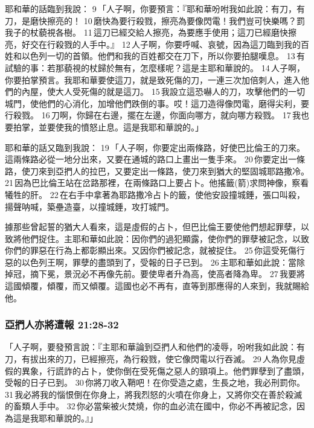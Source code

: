 耶和華的話臨到我說： 9 「人子啊，你要預言：『耶和華吩咐我如此說：有刀，有刀，是磨快擦亮的！ 10 磨快為要行殺戮，擦亮為要像閃電！我們豈可快樂嗎？罰我子的杖藐視各樹。 11 這刀已經交給人擦亮，為要應手使用；這刀已經磨快擦亮，好交在行殺戮的人手中。』 12 人子啊，你要呼喊、哀號，因為這刀臨到我的百姓和以色列一切的首領。他們和我的百姓都交在刀下，所以你要拍腿嘆息。 13 有試驗的事：若那藐視的杖歸於無有，怎麼樣呢？這是主耶和華說的。 14 人子啊，你要拍掌預言。我耶和華要使這刀，就是致死傷的刀，一連三次加倍刺人，進入他們的內屋，使大人受死傷的就是這刀。 15 我設立這恐嚇人的刀，攻擊他們的一切城門，使他們的心消化，加增他們跌倒的事。哎！這刀造得像閃電，磨得尖利，要行殺戮。 16 刀啊，你歸在右邊，擺在左邊，你面向哪方，就向哪方殺戮。 17 我也要拍掌，並要使我的憤怒止息。這是我耶和華說的。」

耶和華的話又臨到我說： 19 「人子啊，你要定出兩條路，好使巴比倫王的刀來。這兩條路必從一地分出來，又要在通城的路口上畫出一隻手來。 20 你要定出一條路，使刀來到亞捫人的拉巴，又要定出一條路，使刀來到猶大的堅固城耶路撒冷。 21 因為巴比倫王站在岔路那裡，在兩條路口上要占卜。他搖籤(箭)求問神像，察看犧牲的肝。 22 在右手中拿著為耶路撒冷占卜的籤，使他安設撞城錘，張口叫殺，揚聲呐喊，築壘造臺，以撞城錘，攻打城門。

據那些曾起誓的猶大人看來，這是虛假的占卜，但巴比倫王要使他們想起罪孽，以致將他們捉住。主耶和華如此說：因你們的過犯顯露，使你們的罪孽被記念，以致你們的罪惡在行為上都彰顯出來。又因你們被記念，就被捉住。 25 你這受死傷行惡的以色列王啊，罪孽的盡頭到了，受報的日子已到。 26 主耶和華如此說：當除掉冠，摘下冕，景況必不再像先前。要使卑者升為高，使高者降為卑。 27 我要將這國傾覆，傾覆，而又傾覆。這國也必不再有，直等到那應得的人來到，我就賜給他。

\subsubsection{亞捫人亦將遭報 21:28-32}
「人子啊，要發預言說：『主耶和華論到亞捫人和他們的凌辱，吩咐我如此說：有刀，有拔出來的刀，已經擦亮，為行殺戮，使它像閃電以行吞滅。 29 人為你見虛假的異象，行謊詐的占卜，使你倒在受死傷之惡人的頸項上。他們罪孽到了盡頭，受報的日子已到。 30 你將刀收入鞘吧！在你受造之處，生長之地，我必刑罰你。 31 我必將我的惱恨倒在你身上，將我烈怒的火噴在你身上，又將你交在善於殺滅的畜類人手中。 32 你必當柴被火焚燒，你的血必流在國中，你必不再被記念，因為這是我耶和華說的。』」

